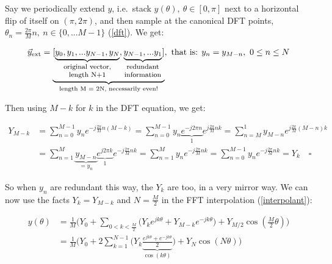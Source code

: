 \documentclass[10pt]{article}
\begin{document}
Say we periodically extend $y$, i.e.~stack $y(\theta),\ \theta \in [0,\pi]$ next to a horizontal flip of itself on $(\pi, 2\pi)$, and then sample at the canonical DFT points, $\theta_n = \frac{2\pi}{M}n,\ n \in \{0, ... M-1\}$ (\autoref{dft}). We get:

$$\vec{y}_{\text{ext}} = \underbrace{[\underbrace{y_0, y_1, ... y_{N-1}, y_N}_{\parbox{20mm}{\footnotesize \centering original vector, length N+1}}, \underbrace{y_{N-1}, ... y_1}_{\parbox{16mm}{\footnotesize \centering redundant information}}]}_{\text{length M = 2N, necessarily even!}}, \text{ that is: } y_n = y_{M-n},\ 0 \leq n \leq N$$\vspace{2mm}

Then using $M-k$ for $k$ in the DFT equation, we get:

\begin{align*}
Y_{M-k} &= \sum_{n=0}^{M-1} y_n e^{-j \frac{2\pi}{M}n(M-k)} = \sum_{n=0}^{M-1} y_n \underbrace{e^{-j 2\pi n}}_{1} e^{j \frac{2\pi}{M}nk} = \sum_{n = M}^{1} y_{M-n} e^{j \frac{2\pi}{M}(M - n)k} \\
&= \sum_{n=1}^{M} \underbrace{y_{M-n}}_{= y_n} \underbrace{e^{j 2\pi k}}_{1} e^{-j\frac{2\pi}{M}nk} = \sum_{n=1}^M y_n e^{-j \frac{2\pi}{M}nk} = \sum_{n=0}^{M-1} y_n e^{-j \frac{2\pi}{M}nk} = Y_k \quad \square
\end{align*}
\newline

So when $y_n$ are redundant this way, the $Y_k$ are too, in a very mirror way. We can now use the facts $Y_k = Y_{M-k}$ and $N = \frac{M}{2}$ in the FFT interpolation (\autoref{interpolant}):

\begin{equation}\label{reconstruction}
\begin{aligned}
y(\theta) &= \frac{1}{M} \Big(Y_0 + \sum_{0 < k < \frac{M}{2}} \big( Y_k e^{j k \theta} + Y_{M-k} e^{-j k \theta}\big) + Y_{M/2}\cos(\frac{M}{2}\theta) \Big) \\
&= \frac{1}{M} \Big(Y_0 + 2 \sum_{k = 1}^{N-1} \big( Y_k \underbrace{\frac{e^{j k \theta} + e^{-j k \theta}}{2}}_{\cos(k\theta)} \big) + Y_N\cos(N \theta) \Big)
\end{aligned}
\end{equation}
\end{document}
